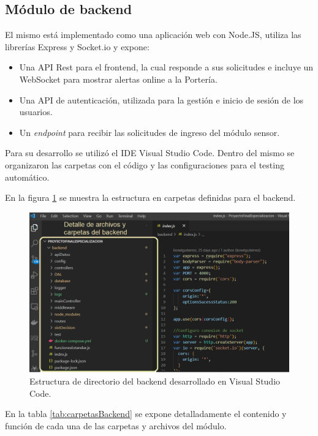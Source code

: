 \subsection{Módulo de backend}

El mismo está implementado como una aplicación web con Node.JS, utiliza las librerías Express y Socket.io y expone:

\begin{itemize}
\item Una API Rest para el frontend, la cual responde a sus solicitudes e incluye un WebSocket para mostrar alertas online a la Portería.
\item Una API de autenticación, utilizada para la gestión e inicio de sesión de los usuarios.
\item Un \textit{endpoint} para recibir las solicitudes de ingreso del módulo sensor.
\end{itemize}

Para su desarrollo se utilizó el IDE Visual Studio Code. Dentro del mismo se organizaron las carpetas con el código y las configuraciones para el testing automático.

En la figura \ref{fig:backendCarpetas}  se muestra la estructura en carpetas definidas para el backend.

\begin{figure}[ht]
	\centering
	\includegraphics[width=1\textwidth]{./Figures/backendCarpetas.png}
	\caption{Estructura de directorio del backend desarrollado en Visual Studio Code.}
	\label{fig:backendCarpetas}
\end{figure}

En la tabla \ref{tab:carpetasBackend}  se expone detalladamente el contenido y función de cada una de las carpetas y archivos del módulo.

